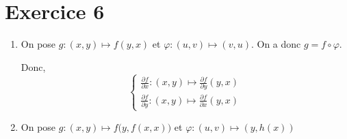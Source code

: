 \part{Exercice 6}

\begin{enumerate}
	\item On pose $g: (x,y) \mapsto f(y,x)$ et $\varphi : (u,v) \mapsto (v,u)$.
		On a donc $g = f \circ \varphi$.

		Donc, \[
			\begin{cases}
				\frac{\partial f}{\partial x} : (x,y) \mapsto \frac{\partial f}{\partial y}(y,x)\\[3mm]
				\frac{\partial f}{\partial y}: (x,y) \mapsto \frac{\partial f}{\partial x}(y,x)
			\end{cases}
		\]
	\item On pose $g : (x,y) \mapsto f\big(y, f(x,x)\big)$ et $\varphi: (u,v) \mapsto (y, h(x))$
\end{enumerate}
